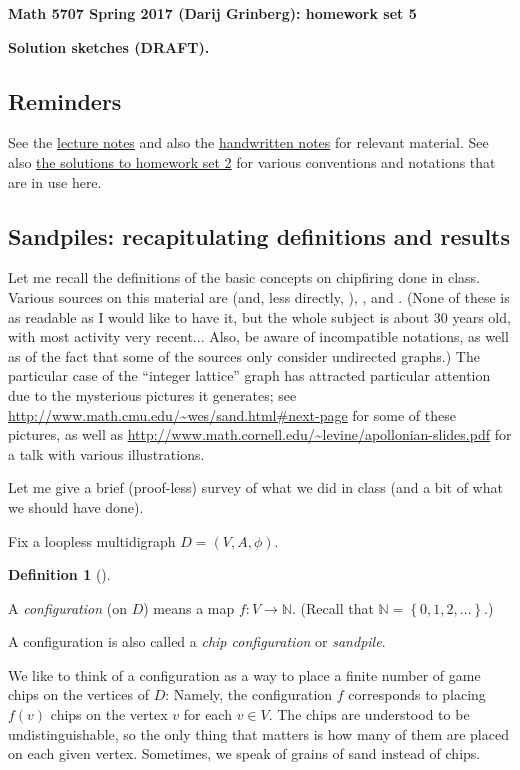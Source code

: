 \documentclass[numbers=enddot,12pt,final,onecolumn,notitlepage]{scrartcl}%
\theoremstyle{definition}
\newtheorem{defi}[theo]{Definition}
\newenvironment{definition}[1][]
{\begin{defi}[#1]\begin{leftbar}}
{\end{leftbar}\end{defi}}
\newcommand{\NN}{\mathbb{N}}
\newcommand{\set}[1]{\left\{ #1 \right\}}
\newcommand{\tup}[1]{\left( #1 \right)}
\begin{document}
\begin{center}
\textbf{Math 5707 Spring 2017 (Darij Grinberg): homework set 5}

\textbf{Solution sketches (DRAFT).}
\end{center}

\tableofcontents

\subsection{Reminders}

See the
\href{http://www-users.math.umn.edu/~dgrinber/5707s17/nogra.pdf}{lecture notes}
and also the
\href{http://www-users.math.umn.edu/~dgrinber/5707s17/}{handwritten notes}
for relevant material.
See also
\href{http://www-users.math.umn.edu/~dgrinber/5707s17/hw2s.pdf}{the solutions to homework set 2}
for various conventions and notations that are in use here.

\subsection{Sandpiles: recapitulating definitions and results}

Let me recall the definitions of the basic concepts on chipfiring
done in class.
Various sources on this material are
\cite{BjoLov92} (and, less directly, \cite{BjLoSh91}),
\cite{HLMPPW13}, \cite[Lectures 29--31]{Musike09} and \cite{CorPet16}.
(None of these is as readable as I would like to have it, but the
whole subject is about 30 years old, with most activity very
recent...
Also, be aware of incompatible notations, as well as of the fact that
some of the sources only consider undirected graphs.)
The particular case of the ``integer lattice'' graph has attracted
particular attention due to the mysterious pictures it generates;
see \url{http://www.math.cmu.edu/~wes/sand.html#next-page} for some
of these pictures, as well as
\url{http://www.math.cornell.edu/~levine/apollonian-slides.pdf} for a
talk with various illustrations.

Let me give a brief (proof-less) survey of what we did in class (and
a bit of what we should have done).

Fix a loopless multidigraph $D = \tup{V, A, \phi}$.

\begin{definition}
A \textit{configuration} (on $D$) means a map $f : V \to \NN$.
(Recall that $\NN = \set{0, 1, 2, \ldots}$.)

A configuration is also called a \textit{chip configuration} or
\textit{sandpile}.

We like to think of a configuration as a way to place
a finite number of game chips on the vertices of $D$:
Namely, the configuration $f$ corresponds to placing
$f \tup{v}$ chips on the vertex $v$ for each $v \in V$.
The chips are understood to be undistinguishable, so the
only thing that matters is how many of them are placed on
each given vertex.
Sometimes, we speak of grains of sand instead of chips.
\end{definition}
\end{document}
